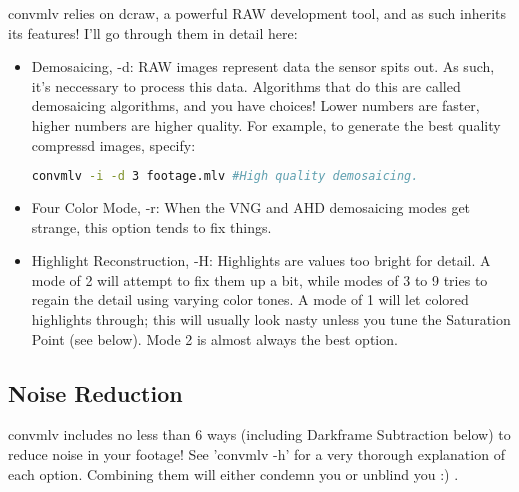 \documentclass[a4paper,12pt]{article}
\begin{document}
			convmlv relies on dcraw, a powerful RAW development tool, and as such inherits its features! I'll go through them in detail here:
		
			\begin{itemize}
					\item Demosaicing, -d: RAW images represent data the sensor spits out. As such, it's neccessary to process
					this data. Algorithms that do this are called demosaicing algorithms, and you have choices! Lower numbers are faster,
					higher numbers are higher quality. For example, to generate the best quality compressd images, specify:
				
	\begin{lstlisting}[language=bash]
		convmlv -i -d 3 footage.mlv #High quality demosaicing.
	\end{lstlisting}

					\item Four Color Mode, -r: When the VNG and AHD demosaicing modes get strange, this option tends to fix things.
					\item Highlight Reconstruction, -H: Highlights are values too bright for detail. A mode of 2 will attempt to fix them up a bit, 
				while modes of 3 to 9 tries to regain the detail using varying color tones. A mode of 1 will let colored highlights through; this will
				usually look nasty unless you tune the Saturation Point (see below). Mode 2 is almost always the best option.
			\end{itemize}
			
		\subsection{Noise Reduction}
			
			convmlv includes no less than 6 ways (including Darkframe Subtraction below) to reduce noise in your footage! See 'convmlv -h' for a very thorough explanation of each option.
			Combining them will either condemn you or unblind you :) .
			
\end{document}
